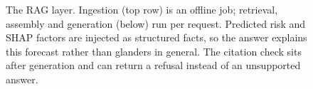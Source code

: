 \begin{figure}[htbp]
\caption{The RAG layer. Ingestion (top row) is an offline job; retrieval, assembly and generation
(below) run per request. Predicted risk and SHAP factors are injected as structured facts, so the
answer explains this forecast rather than glanders in general. The citation check sits after
generation and can return a refusal instead of an unsupported answer.}
\label{fig:rag}
\end{figure}
